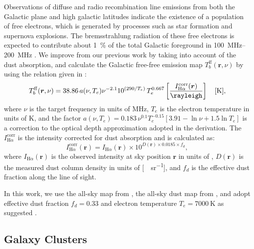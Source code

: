 \documentclass[modern]{aastex61}
\newcommand{\R}[1]{\mathrm{#1}}
\newcommand{\Halpha}{\text{H$\alpha$}}
\begin{document}
Observations of diffuse \Halpha{} and radio recombination line emissions
from both the Galactic plane and high galactic latitudes indicate the
existence of a population of free electrons, which is generated by
processes such as star formation and supernova explosions.
The bremsstrahlung radiation of these free electrons is expected to
contribute about \SI{1}{\percent} of the total Galactic foreground in
\SIrange{100}{200}{\MHz} \citep{shaver1999,jelic2008}.
We improve from our previous work \citep{wang2010} by taking into account
of the dust absorption, and calculate the Galactic free-free emission map
$T_b^{\R{ff}}(\bm{r}, \nu)$ by using the relation given in
\citet{dickinson2003}:
\begin{equation}
  \label{eq:halpha-ff}
  T_b^{\R{ff}}(\bm{r}, \nu) = 38.86 \, a(\nu, T_e) \nu^{-2.1}
    10^{(290 / T_e)} \, T_e^{0.667}
    \left[ \frac{I_{\Halpha}^{\R{corr}}(\bm{r})}{\si{\rayleigh}} \right]
    \quad [\si{\kelvin}],
\end{equation}
where $\nu$ is the target frequency in units of \si{\MHz}, $T_e$ is the
electron temperature in units of \si{\kelvin}, and the factor
$a(\nu, T_e) = 0.183 \,\nu^{0.1} T_e^{-0.15} [3.91 - \ln \nu + 1.5 \ln T_e]$
is a correction to the optical depth approximation adopted in the derivation.
The $I_{\Halpha}^{\R{corr}}$ is the \Halpha{} intensity corrected for dust
absorption and is calculated as:
\begin{equation}
  \label{eq:halpha-dust-corr}
  I_{\Halpha}^{\R{corr}}(\bm{r}) = I_{\Halpha}(\bm{r}) \times
    10^{D(\bm{r}) \times 0.0185 \times f_d},
\end{equation}
where $I_{\Halpha}(\bm{r})$ is the observed \Halpha{} intensity at sky
position $\bm{r}$ in units of \si{\rayleigh},
$D(\bm{r})$ is the measured dust column density in units of
[\si{\mega\jansky\per\steradian}],
and $f_d$ is the effective dust fraction along the line of sight.

In this work, we use the all-sky \Halpha{} map from \citet{finkbeiner2003},
the all-sky dust map from \citet{schlegel1998}, and
adopt effective dust fraction $f_d = 0.33$ and
electron temperature $T_e = \SI{7000}{\kelvin}$
as suggested \citep{dickinson2003}.


\subsection{Galaxy Clusters}
\label{sec:fg-clusters}
\end{document}
